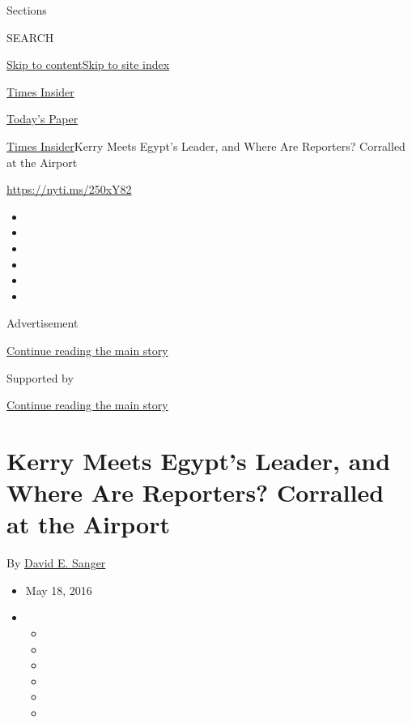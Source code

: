 Sections

SEARCH

\protect\hyperlink{site-content}{Skip to
content}\protect\hyperlink{site-index}{Skip to site index}

\href{https://www.nytimes.com/section/reader-center}{Times Insider}

\href{https://myaccount.nytimes.com/auth/login?response_type=cookie\&client_id=vi}{}

\href{https://www.nytimes.com/section/todayspaper}{Today's Paper}

\href{/section/reader-center}{Times Insider}\textbar{}Kerry Meets
Egypt's Leader, and Where Are Reporters? Corralled at the Airport

\url{https://nyti.ms/250xY82}

\begin{itemize}
\item
\item
\item
\item
\item
\item
\end{itemize}

Advertisement

\protect\hyperlink{after-top}{Continue reading the main story}

Supported by

\protect\hyperlink{after-sponsor}{Continue reading the main story}

\hypertarget{kerry-meets-egypts-leader-and-where-are-reporters-corralled-at-the-airport}{%
\section{Kerry Meets Egypt's Leader, and Where Are Reporters? Corralled
at the
Airport}\label{kerry-meets-egypts-leader-and-where-are-reporters-corralled-at-the-airport}}

By \href{http://www.nytimes.com/by/david-e-sanger}{David E. Sanger}

\begin{itemize}
\item
  May 18, 2016
\item
  \begin{itemize}
  \item
  \item
  \item
  \item
  \item
  \item
  \end{itemize}
\end{itemize}

